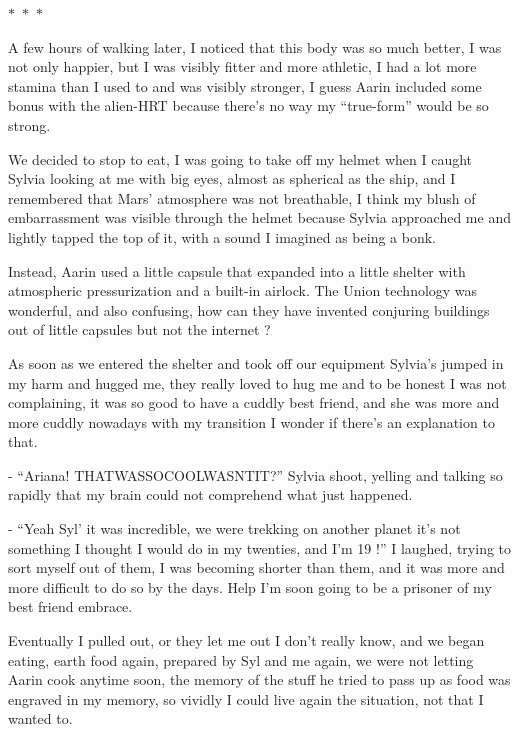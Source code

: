 \documentclass[colorlinks,12pt,a4paper]{book}
\newcommand\sep{\begin{center}
  \boldmath $\ast$~$\ast$~$\ast$
\end{center}}
\begin{document}
\sep

A few hours of walking later, I noticed that this body was so much better, I was not only happier, but I was visibly 
fitter and more athletic, I had a lot more stamina than I used to and was visibly stronger, 
I guess Aarin included some bonus with the alien-HRT because there's no way my “true-form” would be so strong.\par
\bigskip

We decided to stop to eat, I was going to take off my helmet when I caught Sylvia looking at me with big eyes, 
almost as spherical as the ship, and I remembered that Mars' atmosphere was not breathable, 
I think my blush of embarrassment was visible through the helmet because Sylvia approached me and 
lightly tapped the top of it, with a sound I imagined as being a bonk.\par
\bigskip

Instead, Aarin used a little capsule that expanded into a little shelter with atmospheric pressurization 
and a built-in airlock. The Union technology was wonderful, and also confusing, how can they have invented 
conjuring buildings out of little capsules but not the internet ?\par
\bigskip

As soon as we entered the shelter and took off our equipment Sylvia's jumped in my harm and hugged me, 
they really loved to hug me and to be honest I was not complaining, it was so good to have a cuddly best friend, 
and she was more and more cuddly nowadays with my transition I wonder if there's an explanation to that.\par
\bigskip

- “Ariana! THATWASSOCOOLWASNTIT?” Sylvia shoot, yelling and talking so rapidly that my brain 
could not comprehend what just happened.\newline

- “Yeah Syl' it was incredible, we were trekking on another planet it's not something I thought I would do in my twenties, 
and I'm 19 !” I laughed, trying to sort myself out of them, I was becoming shorter than them, and it was more 
and more difficult to do so by the days. Help I'm soon going to be a prisoner of my best friend embrace.\newline

Eventually I pulled out, or they let me out I don't really know, and we began eating, earth food again, 
prepared by Syl and me again, we were not letting Aarin cook anytime soon, the memory of the stuff he tried 
to pass up as food was engraved in my memory, so vividly I could live again the situation, not that I wanted to.\par
\bigskip
\end{document}
